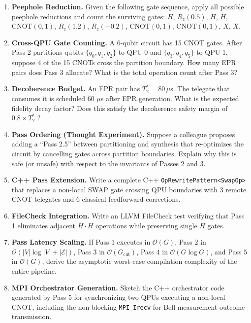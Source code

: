 \begin{enumerate}[label=\textbf{8.\arabic*.}]
    \item \textbf{Peephole Reduction.} Given the following gate sequence, apply all possible peephole reductions and count the surviving gates: $H$, $R_z(0.5)$, $H$, $H$, $\text{CNOT}(0,1)$, $R_z(1.2)$, $R_z(-0.2)$, $\text{CNOT}(0,1)$, $\text{CNOT}(0,1)$, $X$, $X$.
    
    \item \textbf{Cross-QPU Gate Counting.} A 6-qubit circuit has 15 CNOT gates. After Pass 2 partitions qubits $\{q_0, q_1, q_2\}$ to QPU 0 and $\{q_3, q_4, q_5\}$ to QPU 1, suppose 4 of the 15 CNOTs cross the partition boundary. How many EPR pairs does Pass 3 allocate? What is the total operation count after Pass 3?
    
    \item \textbf{Decoherence Budget.} An EPR pair has $T_2^* = 80\,\mu$s. The telegate that consumes it is scheduled 60 $\mu$s after EPR generation. What is the expected fidelity decay factor? Does this satisfy the decoherence safety margin of $0.8 \times T_2^*$ ?
    
    \item \textbf{Pass Ordering (Thought Experiment).} Suppose a colleague proposes adding a ``Pass 2.5'' between partitioning and synthesis that re-optimizes the circuit by cancelling gates across partition boundaries. Explain why this is safe (or unsafe) with respect to the invariants of Passes 2 and 3.
    
    \item \textbf{C++ Pass Extension.} Write a complete C++ \texttt{OpRewritePattern<SwapOp>} that replaces a non-local SWAP gate crossing QPU boundaries with 3 remote CNOT telegates and 6 classical feedforward corrections.
    
    \item \textbf{FileCheck Integration.} Write an LLVM FileCheck test verifying that Pass 1 eliminates adjacent $H \cdot H$ operations while preserving single $H$ gates.
    
    \item \textbf{Pass Latency Scaling.} If Pass 1 executes in $\mathcal{O}(G)$, Pass 2 in $\mathcal{O}(|V| \log |V| + |\mathcal{E}|)$, Pass 3 in $\mathcal{O}(G_{\text{cut}})$, Pass 4 in $\mathcal{O}(G \log G)$, and Pass 5 in $\mathcal{O}(G)$, derive the asymptotic worst-case compilation complexity of the entire pipeline.
    
    \item \textbf{MPI Orchestrator Generation.} Sketch the C++ orchestrator code generated by Pass 5 for synchronizing two QPUs executing a non-local CNOT, including the non-blocking \texttt{MPI\_Irecv} for Bell measurement outcome transmission.
\end{enumerate}
